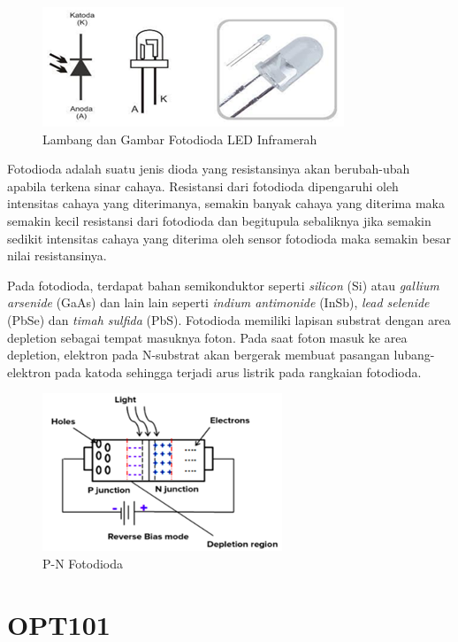 \begin{figure}[H]
    \centering
    \includegraphics{Images/Fotodioda.png}
    \caption{Lambang dan Gambar Fotodioda LED Inframerah}
    \label{fig:led photodiode}
\end{figure}

Fotodioda adalah suatu jenis dioda yang resistansinya akan berubah-ubah apabila terkena sinar
cahaya. Resistansi dari fotodioda dipengaruhi oleh intensitas cahaya yang diterimanya, semakin
banyak cahaya yang diterima maka semakin kecil resistansi dari fotodioda dan begitupula sebaliknya
jika semakin sedikit intensitas cahaya yang diterima oleh sensor fotodioda maka semakin besar nilai
resistansinya\cite{Setyaningsih2017,Arta2020}.

Pada fotodioda, terdapat bahan semikonduktor seperti \textit{silicon} (Si) atau \textit{gallium
arsenide} (GaAs) dan lain lain seperti \textit{indium antimonide} (InSb), \textit{lead selenide}
(PbSe) dan \textit{timah sulfida} (PbS). Fotodioda memiliki lapisan substrat dengan area depletion
sebagai tempat masuknya foton. Pada saat foton masuk ke area depletion, elektron pada N-substrat
akan bergerak membuat pasangan lubang-elektron pada katoda sehingga terjadi arus listrik pada
rangkaian fotodioda\cite{Vlasov2023}.

\begin{figure}[H]
    \centering
    \includegraphics{Images/Bias Fotodioda.png}
    \caption{P-N Fotodioda}
    \label{fig:p-n photodiode}
\end{figure}



\section{OPT101}

